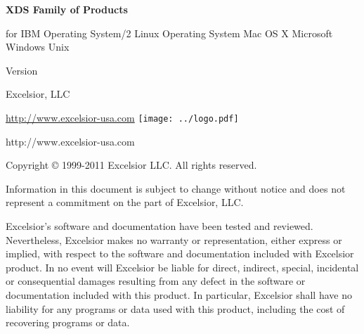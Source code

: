 %
%


\begin{titlepage}


\ifjava\else
\begin{center}
\Large\bf XDS Family of Products
\end{center}
\fi
\vspace{1 in}
\begin{center}
\Huge \bf
\ifcommon
\else
  \ProductName
  \par \Large for
  \ifosii       IBM Operating System/2
  \else\iflinux Linux Operating System
  \else\ifmacosx Mac OS X
  \else\ifwinnt Microsoft Windows 
  \else\ifunix  Unix
  \else\JNO
  \fi\fi\fi\fi\fi
  \par \Large Version \VersionNumber
\ifjava\ifonline\else
  \par{}
\fi\fi
  \vfill
\fi %

\end{center}
\begin{center}
\huge\bf \BookName{}
\end{center}

\vfill
\begin{center}
\ifonline
  {\Large Excelsior, LLC}

  \url{http://www.excelsior-usa.com}
\else
  \texttt{[image: ../logo.pdf]}

  {\sf http://www.excelsior-usa.com}
\fi

\end{center}

\pagebreak
\thispagestyle{empty}
\setcounter{page}{0}
{\small

Copyright \copyright{} 1999-2011 Excelsior LLC. All rights reserved.

Information in this document is subject to change without notice and
does not represent a commitment on the part of Excelsior, LLC.

Excelsior's software and documentation have been tested and reviewed.
Nevertheless, Excelsior makes no warranty or representation,
either express or implied, with respect to the software and
documentation included with Excelsior product. In no event will Excelsior be
liable for direct, indirect, special, incidental or consequential
damages resulting from any defect in the software or
documentation included with this product. In particular, Excelsior
shall have no liability for any programs or data used with this
product, including the cost of recovering programs or data.

}
\end{titlepage}
